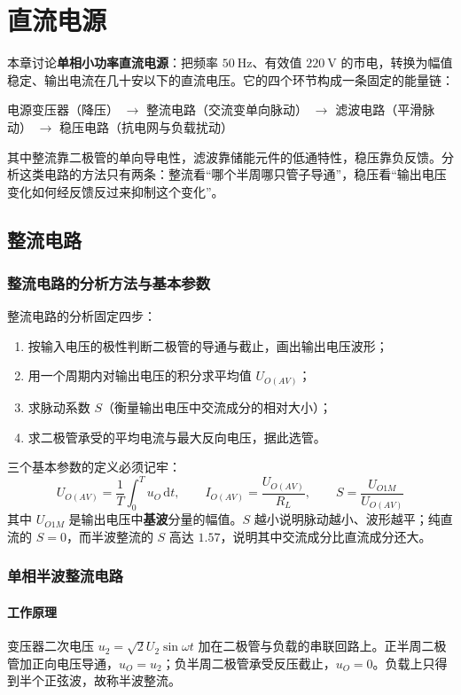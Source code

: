 \chapter{直流电源}

本章讨论\textbf{单相小功率直流电源}：把频率 $50\ \mathrm{Hz}$、有效值 $220\ \mathrm{V}$ 的市电，转换为幅值稳定、输出电流在几十安以下的直流电压。它的四个环节构成一条固定的能量链：

\begin{center}
电源变压器（降压） $\rightarrow$ 整流电路（交流变单向脉动） $\rightarrow$ 滤波电路（平滑脉动） $\rightarrow$ 稳压电路（抗电网与负载扰动）
\end{center}

其中整流靠二极管的单向导电性，滤波靠储能元件的低通特性，稳压靠负反馈。分析这类电路的方法只有两条：整流看“哪个半周哪只管子导通”，稳压看“输出电压变化如何经反馈反过来抑制这个变化”。

\section{整流电路}
\subsection{整流电路的分析方法与基本参数}
整流电路的分析固定四步：
\begin{enumerate}
    \item 按输入电压的极性判断二极管的导通与截止，画出输出电压波形；
    \item 用一个周期内对输出电压的积分求平均值 $U_{O(AV)}$；
    \item 求脉动系数 $S$（衡量输出电压中交流成分的相对大小）；
    \item 求二极管承受的平均电流与最大反向电压，据此选管。
\end{enumerate}

三个基本参数的定义必须记牢：
\begin{equation}
U_{O(AV)}=\frac{1}{T}\int_0^{T}u_O\,\mathrm{d}t,\qquad
I_{O(AV)}=\frac{U_{O(AV)}}{R_L},\qquad
S=\frac{U_{O1M}}{U_{O(AV)}}
\end{equation}
其中 $U_{O1M}$ 是输出电压中\textbf{基波}分量的幅值。$S$ 越小说明脉动越小、波形越平；纯直流的 $S=0$，而半波整流的 $S$ 高达 $1.57$，说明其中交流成分比直流成分还大。

\subsection{单相半波整流电路}
\subsubsection{工作原理}
变压器二次电压 $u_2=\sqrt2U_2\sin\omega t$ 加在二极管与负载的串联回路上。正半周二极管加正向电压导通，$u_O=u_2$；负半周二极管承受反压截止，$u_O=0$。负载上只得到半个正弦波，故称半波整流。

